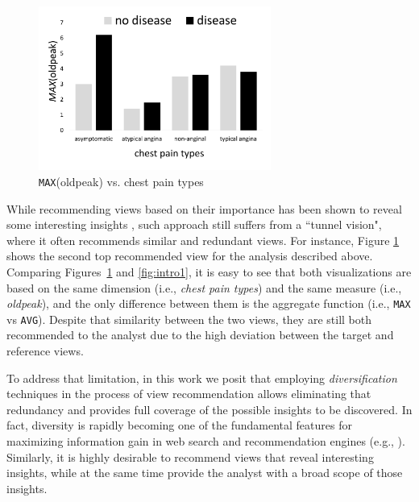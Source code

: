 \begin{figure}
	\includegraphics[width=3.0in]{figures/introduction/cp_max_oldpeak}
	\vspace{-12pt}

	\caption{ {\tt MAX}(oldpeak) vs. chest pain types}
	\label{fig:intro3}
	\vspace{-10pt}

\end{figure}


While recommending views based on their importance has been shown to reveal some interesting insights \cite{Vartak2015, Vartak2014, Ehsan2016}, such approach still suffers from  a ``tunnel vision", where it often recommends similar and redundant views. 
%
For instance, Figure \ref{fig:intro3} shows the second top recommended view for the analysis described above. 
%
Comparing Figures~\ref{fig:intro3} and \ref{fig:intro1}, it is easy to see that both visualizations are based on the same dimension (i.e., {\it chest pain types}) and the same measure (i.e., {\it oldpeak}), and the only difference between them is the aggregate function (i.e., {\tt MAX} vs {\tt AVG}). 
%
Despite that similarity between the two views, they are still both recommended to the analyst due to the high deviation between the target and reference views.



To address that limitation, in this work we posit that employing {\em diversification} techniques in the process of view recommendation allows eliminating that redundancy and provides full coverage of the possible insights to be discovered. 
%
In fact, diversity is rapidly becoming one of the fundamental features for maximizing information gain in web search and recommendation engines (e.g., \cite{Zhang2008,Clarke2008,Rafiei2010, Yu2009}). 
%
Similarly, it is highly desirable to recommend views that reveal interesting insights, while at the same time provide the analyst with a broad scope of those insights.



